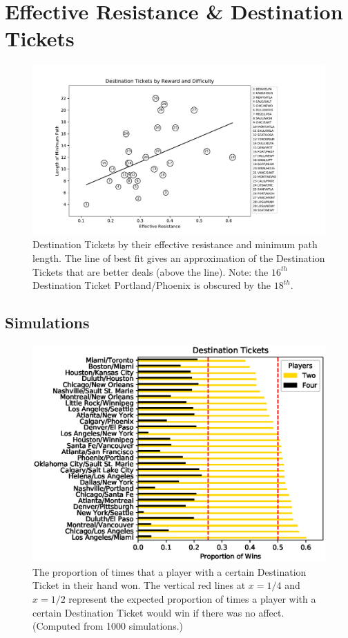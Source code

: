 \section{Effective Resistance \& Destination Tickets}

\begin{figure}[!ht]
\centering
\includegraphics[scale=.8]{figures/resistance}
\caption{Destination Tickets by their effective
resistance and minimum path length.
The line of best fit gives an approximation of the
Destination Tickets that are better deals (above the line).
Note: the $16^{th}$ Destination Ticket Portland/Phoenix is obscured
by the $18^{th}$.}
\label{fig:resistance}
\end{figure}

\subsection{Simulations}

\begin{figure}[!ht]
\centering
\includegraphics[scale=.8]{figures/destination_tickets}
\caption{The proportion of times that a player with a certain
Destination Ticket in their hand won.
The vertical red lines at $x=1/4$ and $x=1/2$ represent
the expected proportion of times a player with a certain Destination Ticket
would win if there was no affect. (Computed from 1000 simulations.)}
\label{fig:tickets}
\end{figure}


